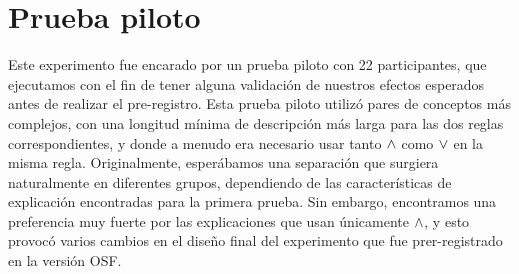 \section{Prueba piloto} \label{subsection:resultsPilot}

Este experimento fue encarado por un prueba piloto con 22 participantes, que ejecutamos con el fin de tener alguna validación de nuestros efectos esperados antes de realizar el pre-registro. Esta prueba piloto utilizó pares de conceptos más complejos, con una longitud mínima de descripción más larga para las dos reglas correspondientes, y donde a menudo era necesario usar tanto $\land $ como $\lor $ en la misma regla. Originalmente, esperábamos una separación que surgiera naturalmente en diferentes grupos, dependiendo de las características de explicación encontradas para la primera prueba. Sin embargo, encontramos una preferencia muy fuerte por las explicaciones que usan únicamente $ \land $, y esto provocó varios cambios en el diseño final del experimento que fue prer-registrado en la versión OSF.


